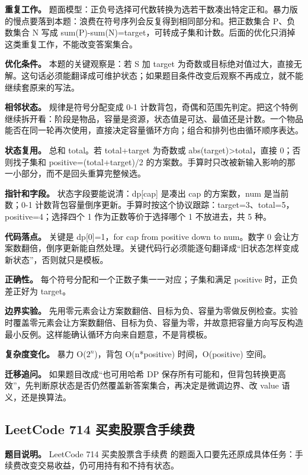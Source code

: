 \textbf{重复工作。} 题面模型：正负号选择可代数转换为选若干数凑出特定正和。暴力版的慢点要落到本题：浪费在符号序列会反复得到相同部分和。把正数集合 P、负数集合 N 写成 sum(P)-sum(N)=target，可转成子集和计数。后面的优化只消掉这类重复工作，不能改变答案集合。

\textbf{优化条件。} 本题的关键观察是：若 S 加 target 为奇数或目标绝对值过大，直接无解。这句话必须能翻译成可维护状态；如果题目条件改变后观察不再成立，就不能继续套原来的写法。

\textbf{相邻状态。} 规律是符号分配变成 0-1 计数背包，奇偶和范围先判定。把这个特例继续拆开看：阶段是物品，容量是资源，状态值是可达、最值还是计数。一个物品能否在同一轮再次使用，直接决定容量循环方向；组合和排列也由循环顺序表达。

\textbf{状态复用。} 总和 total。若 total+target 为奇数或 abs(target)>total，直接 0；否则找子集和 positive=(total+target)/2 的方案数。手算时只改被新输入影响的那一小部分，而不是回头重算完整候选。

\textbf{指针和字段。} 状态字段要能说清：dp[cap] 是凑出 cap 的方案数，num 是当前数；0-1 计数背包容量倒序更新。手算时按这个协议跟踪：target=3、total=5，positive=4；选择四个 1 作为正数等价于选择哪个 1 不放进去，共 5 种。

\textbf{代码落点。} 关键是 dp[0]=1，for cap from positive down to num。数字 0 会让方案数翻倍，倒序更新能自然处理。关键代码行必须能逐句翻译成“旧状态怎样变成新状态”，否则就只是模板。

\textbf{正确性。} 每个符号分配和一个正数子集一一对应；子集和满足 positive 时，正负差正好为 target。

\textbf{边界实验。} 先用零元素会让方案数翻倍、目标为负、容量为零做反例检查。实验时覆盖零元素会让方案数翻倍、目标为负、容量为零，并故意把容量方向写反构造最小反例。这样能确认循环方向来自题意，不是背模板。

\textbf{复杂度变化。} 暴力 O(\ensuremath{2^{n}})，背包 O(n*positive) 时间，O(positive) 空间。

\textbf{迁移追问。} 如果题目改成“也可用哈希 DP 保存所有可能和，但背包转换更高效”，先判断原状态是否仍然覆盖新答案集合，再决定是微调边界、改 value 语义，还是换算法。

\subsection{LeetCode 714 买卖股票含手续费}

\textbf{题目说明。} LeetCode 714 买卖股票含手续费 的题面入口要先还原成具体任务：手续费改变交易收益，仍可用持有和不持有状态。

